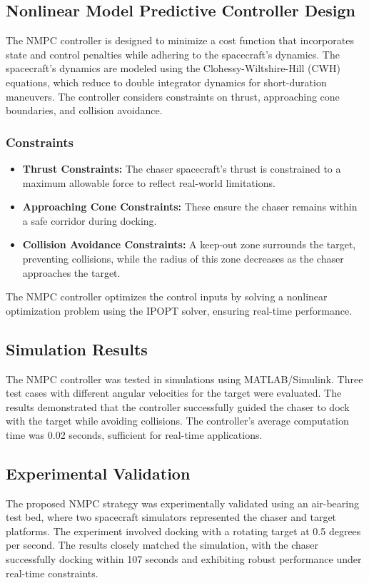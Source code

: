 \documentclass[a4paper,12pt]{article}
\begin{document}
\subsection{Nonlinear Model Predictive Controller Design}
The NMPC controller is designed to minimize a cost function that incorporates state and control penalties while adhering to the spacecraft's dynamics. The spacecraft's dynamics are modeled using the Clohessy-Wiltshire-Hill (CWH) equations, which reduce to double integrator dynamics for short-duration maneuvers. The controller considers constraints on thrust, approaching cone boundaries, and collision avoidance.

\subsubsection{Constraints}
\begin{itemize}
	\item \textbf{Thrust Constraints:} The chaser spacecraft's thrust is constrained to a maximum allowable force to reflect real-world limitations.
	\item \textbf{Approaching Cone Constraints:} These ensure the chaser remains within a safe corridor during docking.
	\item \textbf{Collision Avoidance Constraints:} A keep-out zone surrounds the target, preventing collisions, while the radius of this zone decreases as the chaser approaches the target.
\end{itemize}

The NMPC controller optimizes the control inputs by solving a nonlinear optimization problem using the IPOPT solver, ensuring real-time performance.

\subsection{Simulation Results}
The NMPC controller was tested in simulations using MATLAB/Simulink. Three test cases with different angular velocities for the target were evaluated. The results demonstrated that the controller successfully guided the chaser to dock with the target while avoiding collisions. The controller's average computation time was 0.02 seconds, sufficient for real-time applications.

\subsection{Experimental Validation}
The proposed NMPC strategy was experimentally validated using an air-bearing test bed, where two spacecraft simulators represented the chaser and target platforms. The experiment involved docking with a rotating target at 0.5 degrees per second. The results closely matched the simulation, with the chaser successfully docking within 107 seconds and exhibiting robust performance under real-time constraints.
\end{document}
